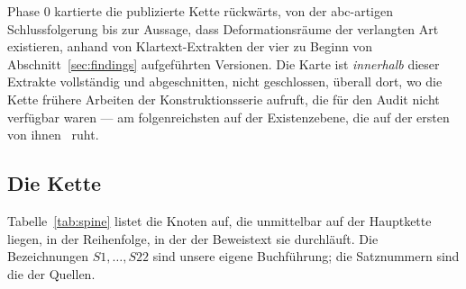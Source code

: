 \documentclass[11pt,a4paper]{article}
\theoremstyle{definition}
\theoremstyle{remark}
\begin{document}
Phase 0 kartierte die publizierte Kette rückwärts, von der abc-artigen
Schlussfolgerung bis zur Aussage, dass Deformationsräume der verlangten Art
existieren, anhand von Klartext-Extrakten der vier zu Beginn von
Abschnitt~\ref{sec:findings} aufgeführten Versionen. Die Karte ist
\emph{innerhalb} dieser Extrakte vollständig und abgeschnitten, nicht
geschlossen, überall dort, wo die Kette frühere Arbeiten der
Konstruktionsserie aufruft, die für den Audit nicht verfügbar waren --- am
folgenreichsten auf der Existenzebene, die auf der ersten von
ihnen~\cite{joshiI} ruht.

\subsection{Die Kette}

Tabelle~\ref{tab:spine} listet die Knoten auf, die unmittelbar auf der
Hauptkette liegen, in der Reihenfolge, in der der Beweistext sie durchläuft.
Die Bezeichnungen $S1,\dots,S22$ sind unsere eigene Buchführung; die
Satznummern sind die der Quellen.
\end{document}
